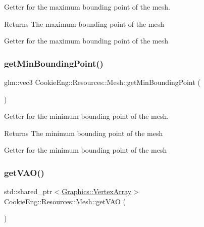 Getter for the maximum bounding point of the mesh. 

\begin{DoxyReturn}{Returns}
The maximum bounding point of the mesh
\end{DoxyReturn}
Getter for the maximum bounding point of the mesh \mbox{\label{struct_cookie_eng_1_1_resources_1_1_mesh_af1231ef8a39e13d5a89b0c51ad9e025c}} 
\subsubsection{\texorpdfstring{get\+Min\+Bounding\+Point()}{getMinBoundingPoint()}}
{\footnotesize\ttfamily glm\+::vec3 Cookie\+Eng\+::\+Resources\+::\+Mesh\+::get\+Min\+Bounding\+Point (\begin{DoxyParamCaption}{ }\end{DoxyParamCaption})\hspace{0.3cm}{\ttfamily [inline]}}



Getter for the minimum bounding point of the mesh. 

\begin{DoxyReturn}{Returns}
The minimum bounding point of the mesh
\end{DoxyReturn}
Getter for the minimum bounding point of the mesh \mbox{\label{struct_cookie_eng_1_1_resources_1_1_mesh_ab61a5cfe63393488dfb17a905e7721d6}} 
\subsubsection{\texorpdfstring{get\+V\+A\+O()}{getVAO()}}
{\footnotesize\ttfamily std\+::shared\+\_\+ptr$<$\hyperlink{class_cookie_eng_1_1_graphics_1_1_vertex_array}{Graphics\+::\+Vertex\+Array}$>$ Cookie\+Eng\+::\+Resources\+::\+Mesh\+::get\+V\+AO (\begin{DoxyParamCaption}{ }\end{DoxyParamCaption})\hspace{0.3cm}{\ttfamily [inline]}}



